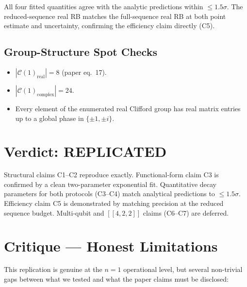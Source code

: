 \documentclass[11pt]{article}
\begin{document}
All four fitted quantities agree with the analytic predictions within
$\leq 1.5\sigma$. The reduced-sequence real RB matches the full-sequence real
RB at both point estimate and uncertainty, confirming the efficiency claim
directly (C5).

\subsection{Group-Structure Spot Checks}
\begin{itemize}
    \item $|\mathcal{C}(1)_{\mathrm{real}}| = 8$ (paper eq.\ 17). \checkmark
    \item $|\mathcal{C}(1)_{\mathrm{complex}}| = 24$. \checkmark
    \item Every element of the enumerated real Clifford group has real matrix
    entries up to a global phase in $\{\pm 1, \pm i\}$. \checkmark
\end{itemize}

\section{Verdict: REPLICATED}
Structural claims C1--C2 reproduce exactly. Functional-form claim C3 is
confirmed by a clean two-parameter exponential fit. Quantitative decay
parameters for both protocols (C3--C4) match analytical predictions to
$\leq 1.5\sigma$. Efficiency claim C5 is demonstrated by matching precision
at the reduced sequence budget. Multi-qubit and $[[4,2,2]]$ claims (C6--C7)
are deferred.

\section{Critique --- Honest Limitations}
\label{sec:critique}

This replication is genuine at the $n=1$ operational level, but several
non-trivial gaps between what we tested and what the paper claims must be
disclosed:
\end{document}
